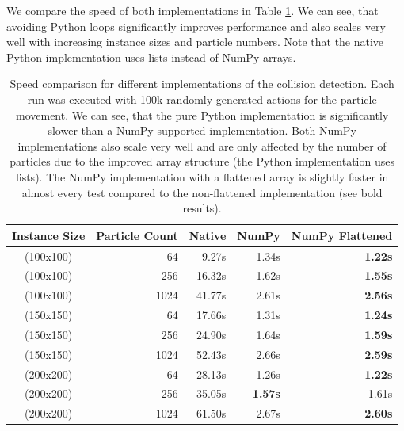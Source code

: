 We compare the speed of both implementations in Table \ref{tab:MazeImplementation/CollisionDetectionSpeed}. We can see, that avoiding Python loops significantly improves performance and also scales very well with increasing instance sizes and particle numbers. Note that the native Python implementation uses lists instead of NumPy arrays.


\begin{table}[htp]
    \begin{center}
        \begin{tabular}{crrrr}
            \toprule
            \multicolumn{1}{c}{Instance Size} & \multicolumn{1}{c}{Particle Count} & \multicolumn{1}{c}{Native} & \multicolumn{1}{c}{NumPy} & \multicolumn{1}{c}{NumPy Flattened} \\
            \midrule
            (100x100) & 64 & 9.27s & 1.34s & \textbf{1.22s} \\
            (100x100) & 256 & 16.32s & 1.62s & \textbf{1.55s} \\
            (100x100) & 1024 & 41.77s & 2.61s & \textbf{2.56s} \\
            \midrule
            (150x150) & 64 & 17.66s & 1.31s & \textbf{1.24s} \\
            (150x150) & 256 & 24.90s & 1.64s & \textbf{1.59s} \\
            (150x150) & 1024 & 52.43s & 2.66s & \textbf{2.59s} \\
            \midrule
            (200x200) & 64 & 28.13s & 1.26s & \textbf{1.22s} \\
            (200x200) & 256 & 35.05s & \textbf{1.57s} & 1.61s \\
            (200x200) & 1024 & 61.50s & 2.67s & \textbf{2.60s} \\
            \bottomrule
        \end{tabular}
    \end{center}
    \caption[Speed Comparison for Different Collision Detection Implementations]{Speed comparison for different implementations of the collision detection. Each run was executed with 100k randomly generated actions for the particle movement. We can see, that the pure Python implementation is significantly slower than a NumPy supported implementation. Both NumPy implementations also scale very well and are only affected by the number of particles due to the improved array structure (the Python implementation uses lists). The NumPy implementation with a flattened array is slightly faster in almost every test compared to the non-flattened implementation (see bold results).} \label{tab:MazeImplementation/CollisionDetectionSpeed}
\end{table}

